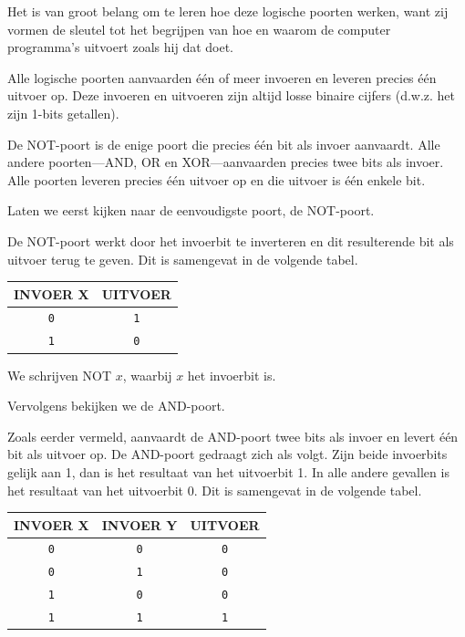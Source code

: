 Het is van groot belang om te leren hoe deze logische poorten werken, want zij vormen de sleutel tot het begrijpen van hoe en waarom de computer programma's uitvoert zoals hij dat doet.

Alle logische poorten aanvaarden één of meer invoeren en leveren precies één uitvoer op. Deze invoeren en uitvoeren zijn altijd losse binaire cijfers (d.w.z. het zijn 1-bits getallen).

De NOT-poort is de enige poort die precies één bit als invoer aanvaardt. Alle andere poorten---AND, OR en XOR---aanvaarden precies twee bits als invoer. Alle poorten leveren precies één uitvoer op en die uitvoer is één enkele bit.

Laten we eerst kijken naar de eenvoudigste poort, de NOT-poort.

De NOT-poort werkt door het invoerbit te inverteren en dit resulterende bit als uitvoer terug te geven. Dit is samengevat in de volgende tabel.
\begin{center}
	\begin{tabular}{c|c}
	  \hline
		INVOER X & UITVOER \\ \hline		\texttt{0} & \texttt{1} \\ \hline		\texttt{1} & \texttt{0} \\ \hline
	\end{tabular}
\end{center}

We schrijven NOT $x$, waarbij $x$ het invoerbit is.

Vervolgens bekijken we de AND-poort.

Zoals eerder vermeld, aanvaardt de AND-poort twee bits als invoer en levert één bit als uitvoer op. De AND-poort gedraagt zich als volgt. Zijn beide invoerbits gelijk aan 1, dan is het resultaat van het uitvoerbit 1. In alle andere gevallen is het resultaat van het uitvoerbit 0. Dit is samengevat in de volgende tabel.
\begin{center}
	\begin{tabular}{cc|c}
	  \hline
		INVOER X & INVOER Y & UITVOER \\ \hline		\texttt{0} & \texttt{0} & \texttt{0} \\ \hline		\texttt{0} & \texttt{1} & \texttt{0} \\ \hline		\texttt{1} & \texttt{0} & \texttt{0} \\ \hline		\texttt{1} & \texttt{1} & \texttt{1} \\ \hline
	\end{tabular}
\end{center}

